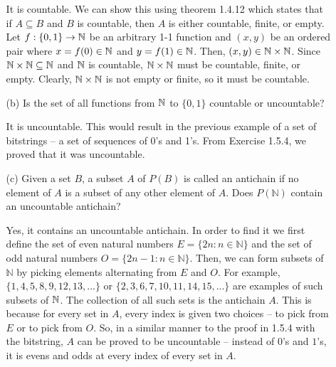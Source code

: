 \documentclass[12pt,letterpaper]{article}
\begin{document}
\begin{itemize}[leftmargin=!,labelindent=5pt]
\begin{itemize}
                It is countable.
                We can show this using theorem 1.4.12 which states that if $A \subseteq B$ and $B$ is countable, then $A$ is either countable, finite, or empty.
                Let $f: \{0,1\} \to \mathbb{N}$ be an arbitrary 1-1 function and $(x,y)$ be an ordered pair where $x = f(0) \in \mathbb{N}$ and $y = f(1) \in \mathbb{N}$.
                Then, $(x,y) \in \mathbb{N} \times \mathbb{N}$.
                Since $\mathbb{N}\times \mathbb{N} \subseteq \mathbb{N}$ and $\mathbb{N}$ is countable, $\mathbb{N}\times \mathbb{N}$ must be countable, finite, or empty.
                Clearly, $\mathbb{N} \times \mathbb{N}$ is not empty or finite, so it must be countable.
                \item [(b)] Is the set of all functions from $\mathbb{N}$ to $\{0, 1\}$ countable or uncountable?
                
                It is uncountable.
                This would result in the previous example of a set of bitstrings -- a set of sequences of 0's and 1's.
                From Exercise 1.5.4, we proved that it was uncountable.
                \item [(c)] Given a set $B$, a subset $A$ of $P(B)$ is called an antichain if no element of $A$ is a subset of any other element of $A$. Does $P(\mathbb{N})$ contain an uncountable antichain?
                
                Yes, it contains an uncountable antichain.
                In order to find it we first define the set of even natural numbers $E = \{2n : n \in \mathbb{N}\}$ and the set of odd natural numbers $O = \{2n-1 : n \in \mathbb{N}\}$.
                Then, we can form subsets of $\mathbb{N}$ by picking elements alternating from $E$ and $O$.
                For example, $\{1,4,5,8,9,12,13,...\}$ or $\{2,3,6,7,10,11,14,15,...\}$ are examples of such subsets of $\mathbb{N}$.
                The collection of all such sets is the antichain $A$.
                This is because for every set in $A$, every index is given two choices -- to pick from $E$ or to pick from $O$.
                So, in a similar manner to the proof in 1.5.4 with the bitstring, $A$ can be proved to be uncountable -- instead of $0$'s and $1$'s, it is evens and odds at every index of every set in $A$.
            \end{itemize}
\end{itemize}
\end{document}
